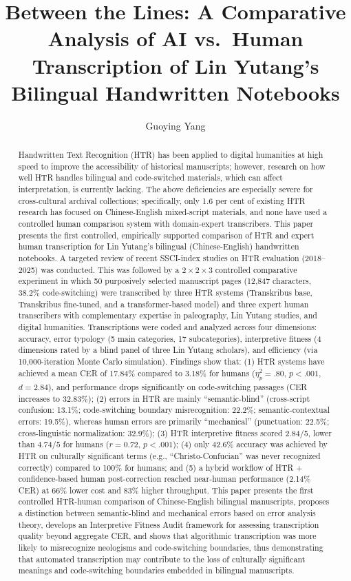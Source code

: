 \documentclass[final]{anthology-ch} %
\title{Between the Lines: A Comparative Analysis of AI vs.\ Human Transcription of Lin Yutang's Bilingual Handwritten Notebooks}
\author[1,2]{Guoying Yang}[
  orcid=0009-0000-0689-4082,
  email=gyyang@jmu.edu.cn
]
\affiliation{1}{School of Foreign Languages, JiMei University, China}
\affiliation{2}{Department of Asian and Middle Eastern Studies, University of North Carolina at Chapel Hill, USA}
\begin{document}
\maketitle

\begin{abstract}
Handwritten Text Recognition (HTR) has been applied to digital humanities at high speed to improve the accessibility of historical manuscripts; however, research on how well HTR handles bilingual and code-switched materials, which can affect interpretation, is currently lacking. The above deficiencies are especially severe for cross-cultural archival collections; specifically, only 1.6 per cent of existing HTR research has focused on Chinese-English mixed-script materials, and none have used a controlled human comparison system with domain-expert transcribers. This paper presents the first controlled, empirically supported comparison of HTR and expert human transcription for Lin Yutang's bilingual (Chinese-English) handwritten notebooks. A targeted review of recent SSCI-index studies on HTR evaluation (2018--2025) was conducted. This was followed by a $2\times2\times3$ controlled comparative experiment in which 50 purposively selected manuscript pages (12,847 characters, 38.2\% code-switching) were transcribed by three HTR systems (Transkribus base, Transkribus fine-tuned, and a transformer-based model) and three expert human transcribers with complementary expertise in paleography, Lin Yutang studies, and digital humanities. Transcriptions were coded and analyzed across four dimensions: accuracy, error typology (5 main categories, 17 subcategories), interpretive fitness (4 dimensions rated by a blind panel of three Lin Yutang scholars), and efficiency (via 10,000-iteration Monte Carlo simulation). Findings show that: (1) HTR systems have achieved a mean CER of 17.84\% compared to 3.18\% for humans ($\eta^2_p = .80$, $p < .001$, $d = 2.84$), and performance drops significantly on code-switching passages (CER increases to 32.83\%); (2) errors in HTR are mainly \enquote{semantic-blind} (cross-script confusion: 13.1\%; code-switching boundary misrecognition: 22.2\%; semantic-contextual errors: 19.5\%), whereas human errors are primarily \enquote{mechanical} (punctuation: 22.5\%; cross-linguistic normalization: 32.9\%); (3) HTR interpretive fitness scored 2.84/5, lower than 4.74/5 for humans ($r = 0.72$, $p < .001$); (4) only 42.6\% accuracy was achieved by HTR on culturally significant terms (e.g., \enquote{Christo-Confucian} was never recognized correctly) compared to 100\% for humans; and (5) a hybrid workflow of HTR + confidence-based human post-correction reached near-human performance (2.14\% CER) at 66\% lower cost and 83\% higher throughput. This paper presents the first controlled HTR-human comparison of Chinese-English bilingual manuscripts, proposes a distinction between semantic-blind and mechanical errors based on error analysis theory, develops an Interpretive Fitness Audit framework for assessing transcription quality beyond aggregate CER, and shows that algorithmic transcription was more likely to misrecognize neologisms and code-switching boundaries, thus demonstrating that automated transcription may contribute to the loss of culturally significant meanings and code-switching boundaries embedded in bilingual manuscripts.

\end{abstract}
\end{document}
